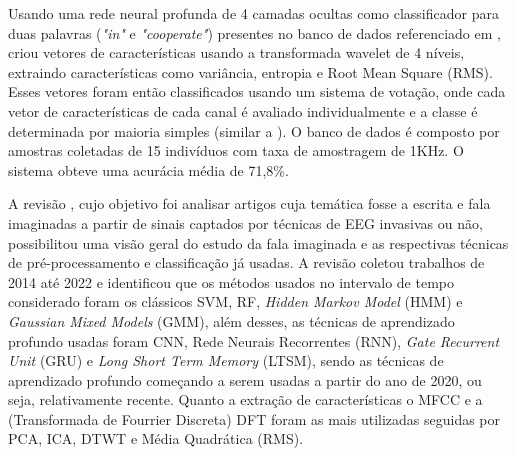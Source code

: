 			\par Usando uma rede neural profunda de 4 camadas ocultas como classificador para duas palavras (\textit{"in"} e \textit{"cooperate"}) presentes no banco de dados referenciado em \cite{dasalla2009single}, \cite{panachakel2020novel} criou vetores de características usando a transformada wavelet de 4 níveis, extraindo características como variância, entropia e Root Mean Square (RMS). Esses vetores foram então classificados usando um sistema de votação, onde cada vetor de características de cada canal é avaliado individualmente e a classe é determinada por maioria simples (similar a \cite{Panachakel_2019}). O banco de dados é composto por amostras coletadas de 15 indivíduos com taxa de amostragem de 1KHz. O sistema obteve uma acurácia média de 71,8\%.
			
			\par A revisão \cite{s23125575}, cujo objetivo foi analisar artigos cuja temática fosse a escrita e fala imaginadas a partir de sinais captados por técnicas de EEG invasivas ou não, possibilitou uma visão geral do estudo da fala imaginada e as respectivas técnicas de pré-processamento e classificação já usadas. A revisão coletou trabalhos de 2014 até 2022 e identificou que os métodos usados no intervalo de tempo considerado foram os clássicos SVM, RF, \textit{Hidden Markov Model} (HMM) e \textit{Gaussian Mixed Models} (GMM), além desses, as técnicas de aprendizado profundo usadas foram CNN, Rede Neurais Recorrentes (RNN), \textit{Gate Recurrent Unit} (GRU) e \textit{Long Short Term Memory} (LTSM), sendo as técnicas de aprendizado profundo começando a serem usadas a partir do ano de 2020, ou seja, relativamente recente. Quanto a extração de características o MFCC e a (Transformada de Fourrier Discreta) DFT foram as mais utilizadas seguidas por PCA, ICA, DTWT e Média Quadrática (RMS).
			
